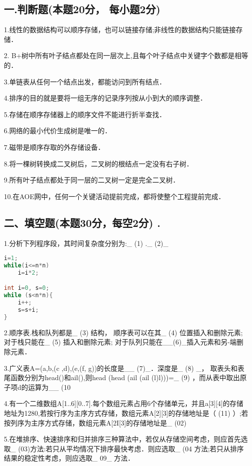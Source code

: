 
\subsection{一.判断题(本题20分， 每小题2分)}

1.线性的数据结构可以顺序存储，也可以链接存储;非线性的数据结构只能链接存储．

2. B+树中所有叶子结点都处在同一层次上,且每个叶子结点中关键字个数都是相等的．

3.单链表从任何一个结点出发，都能访问到所有结点．

4.排序的目的就是要将一组无序的记录序列按从小到大的顺序调整．

5.存储在顺序存储器上的顺序文件不能进行折半查找．

6.网络的最小代价生成树是唯一的．

7.磁带是顺序存取的外存储设备．

8.将一棵树转换成二叉树后，二叉树的根结点一定没有右子树．

9.所有叶子结点都处于同一层的二叉树一定是完全二叉树．

10.在AOE网中，任何一个关键活动提前完成，都将使整个工程提前完成．

\subsection{二、填空题(本题30分，每空2分) .}

1.分析下列程序段，其时间复杂度分别为:_ (1) ._ (2)_
\begin{lstlisting}[language=cpp]
i=1;
while(i<=n*n)
    i=i*2;

int i=0, s=0;
while (s<n*n){
    i++;
    s=s+i;
}
\end{lstlisting}

2.顺序表.栈和队列都是_ (3) 结构， 顺序表可以在其_ (4) 位置插入和删除元素;对于栈只能在_ (5) 插入和删除元素; 对于队列只能在__(6)_插入元素和另-端删除元素．

3.广义表A=(a,b,(c ,d),(e,(f, g))的长度是__ (7)_．深度是_ (8) _， 取表头和表尾函数分别为head()和ail(),则head (head (ail (ail (l)l)))=_ (9) ，而从表中取出原子项d的运算为__ (10

4.有一个二维数组A[1..6][0..7].每个数组元素占用6个存储单元，并且a[3][4]的存储地址为1280,若按行序为主序方式存储，数组元素A[2][3]的存储地址是（ (11) ）;若按列序为主序方式存储，数组元素A[2I[3]的存储地址是_ (02)

5.在堆排序、快速排序和归并排序三种算法中，若仅从存储空间考虑，则应首先选取_ (03)方法:若只从平均情况下排序最快考虑．则应选取_ (04 方法;若只从排序结果的稳定性考虑，则应选取_ 09_ 方法．
